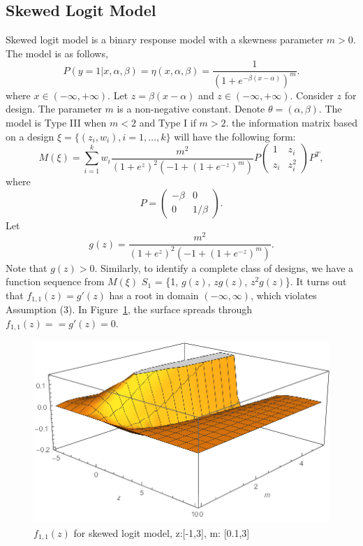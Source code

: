 \documentclass[11pt]{amsart}
\theoremstyle{definition}
\theoremstyle{remark}
\numberwithin{equation}{section}
\begin{document}
\subsection{Skewed Logit Model}
Skewed logit model is a binary response model with a skewness parameter $m>0$. The model is as follows,\[
P(y=1|x,\alpha,\beta) = \eta(x,\alpha,\beta)= \frac{1}{(1+e^{-\beta(x-\alpha)})^m}.
\]where $x\in (-\infty,+\infty)$. Let $z = \beta(x-\alpha)$ and $z\in (-\infty,+\infty)$. Consider $z$ for design. The parameter $m$ is a non-negative constant. Denote $\theta = (\alpha,\beta)$. The model is Type III when $m<2$ and Type I if $m>2$. the information matrix based on a design $\xi = \{(z_i,w_i), i=1,\ldots,k\}$ will have the following form: \begin{equation}
M(\xi) = \sum_{i=1}^{k} w_i \frac{m^2}{(1+e^z)^2(-1+(1+e^{-z})^m)}P \left( \begin{array}{cc}
1 & z_i\\
z_i & z_i^2
\end{array} \right) P^T,
\end{equation} where \[P = \left( \begin{array}{cc}
-\beta & 0\\
0 & 1/\beta
\end{array} \right).\] 
Let \[g(z) =  \frac{m^2}{(1+e^z)^2(-1+(1+e^{-z})^m)}.\] Note that $g(z)>0$.  Similarly, to identify a complete class of designs, we have a function sequence from $M(\xi)$ $S_1$ = \{1, $g(z)$, $zg(z)$, $z^2g(z)$\}. It turns out that $f_{1,1}(z) = g'(z)$ has a root in domain $(-\infty,\infty)$, which violates Assumption (3). In Figure~\ref{fig:skewedlogit_before}, the surface spreads through $f_{1,1}(z)= = g'(z) = 0$.\begin{figure}[h]
    \centering
    \includegraphics[scale = 0.8]{skewlogit_before_dg.png}
    \caption{$f_{1,1}(z)$ for skewed logit model, z:[-1,3], m: [0.1,3]}
    \label{fig:skewedlogit_before}
\end{figure}
\end{document}
